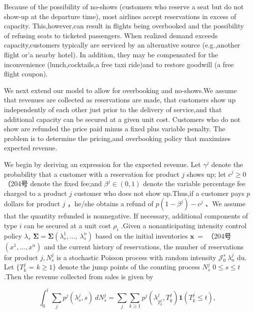 Because of the possibility of no-shows (customers who reserve a seat but
do not show-up at the departure time), most airlines accept reservations
in excess of capacity. This,however,can result in flights being
overbooked and the possibility of refusing seats to ticketed passengers.
When realized demand exceeds capacity,customers typically are serviced
by an alternative source (e.g.,another flight or'a nearby hotel). In
addition, they may be compensated for the inconvenience
(lunch,cocktails,a free taxi ride)and to restore goodwill (a free flight
coupon).

We next extend our model to allow for overbooking and no-shows.We assume
that revenues are collected as reservations are made, that customers
show up independently of each other just prior to the delivery of
service,and that additional capacity can be secured at a given unit
cost. Customers who do not show are refunded the price paid minus a
fixed plus variable penalty. The problem is to determine the pricing,and
overbooking policy that maximizes expected revenue.

We begin by deriving an expression for the expected revenue. Let
\(\gamma ^ { j }\) denote the probability that a customer with a
reservation for product \(j\) shows up; let \(c ^ { j } \geqslant 0\)
（204号 denote the fixed fee;and \(\beta ^ { j } \in ( 0 , 1 )\) denote
the variable percentage fee charged to a product \(j\) customer who does
not show up.Thus,if a customer pays \(p\) dollars for product \(j\)
，he/she obtains a refund of \(p ( 1 - \beta ^ { j } ) - c ^ { j }\)
、We assume that the quantity refunded is nonnegative. If necessary,
additional components of type \(i\) can be secured at a unit cost
\(\rho _ { i }\) .Given a nonanticipating intensity control policy
\(\lambda _ { s }\)
\(\mathbf { \Sigma } = \mathbf { \Sigma } ( \lambda _ { s } ^ { 1 } , \ldots , \ \lambda _ { s } ^ { n } )\)
based on the initial inventories \(\boldsymbol { x } ~ =\) （204号
\(( x ^ { 1 } , \ldots , x ^ { n } )\) and the current history of
reservations, the number of reservations for product
\(j , N _ { s } ^ { j }\) is a stochastic Poisson process with random
intensity \(\mathcal { J } _ { 0 } ^ { s } \ \lambda _ { u } ^ { j }\)
du. Let \(\{ T _ { k } ^ { j }\) = \(k \geqslant 1 \}\) denote the jump
points of the counting process \(N _ { s } ^ { j }\)
\(0 \leqslant s \leqslant t\) .Then the revenue collected from sales is
given by

\[
\int _ { 0 } ^ { t } \sum _ { j } p ^ { j } ( \lambda _ { s } ^ { j } , s ) \ d N _ { s } ^ { j } = \sum _ { j } \sum _ { k \geqslant 1 } p ^ { j } ( \lambda _ { T _ { k } ^ { j } } ^ { j } , T _ { k } ^ { j } ) \mathbf { 1 } ( T _ { k } ^ { j } \leqslant t ) ,
\]

